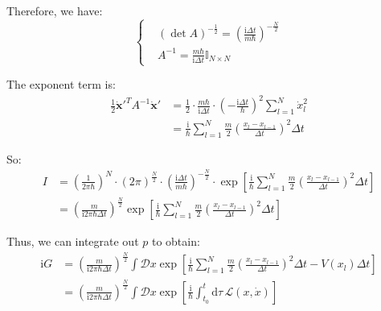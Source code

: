 Therefore, we have:
\begin{equation}
\left\{
\begin{aligned}
&(\det A)^{-\frac{1}{2}} = \left( \frac{\mathrm{i}\Delta t}{m\hbar} \right)^{-\frac{N}{2}}\\
&A^{-1} = \frac{m\hbar}{\mathrm{i}\Delta t} \mathbb{I}_{N \times N}
\end{aligned}
\right.
\end{equation}

The exponent term is:
\begin{equation}
\begin{aligned}
\frac{1}{2} \dot{\bm{x}}'^T A^{-1} \dot{\bm{x}}' 
&= \frac{1}{2} \cdot \frac{m\hbar}{\mathrm{i}\Delta t} \cdot \left( -\frac{\mathrm{i} \Delta t}{\hbar} \right)^2 \sum_{l=1}^N \dot{x}_l^2 \\
&= \frac{\mathrm{i}}{\hbar} \sum_{l=1}^N \frac{m}{2} (\frac{x_l - x_{l-1}}{\Delta t})^2 \Delta t
\end{aligned}
\end{equation}

So:
\begin{equation}
\begin{aligned}
I &= \left( \frac{1}{2\pi\hbar} \right)^N \cdot (2\pi)^{\frac{N}{2}} \cdot \left( \frac{\mathrm{i}\Delta t}{m\hbar} \right)^{-\frac{N}{2}} 
\cdot \exp \left[ \frac{\mathrm{i}}{\hbar} \sum_{l=1}^N  \frac{m}{2} (\frac{x_l-x_{l-1}}{\Delta t})^2 \Delta t \right] \\
&= \left( \frac{m}{\mathrm{i} 2\pi\hbar\Delta t} \right)^{\frac{N}{2}} 
\exp \left[ \frac{\mathrm{i}}{\hbar} \sum_{l=1}^N \frac{m}{2} (\frac{x_l-x_{l-1}}{\Delta t})^2 \Delta t \right]
\end{aligned}
\end{equation}

Thus, we can integrate out $p$ to obtain:
\begin{equation}
    \begin{aligned}
    \mathrm{i}G &= \left( \frac{m}{\mathrm{i} 2\pi\hbar\Delta t} \right)^{\frac{N}{2}} 
    \int \mathcal{D}x \exp \left[ \frac{\mathrm{i}}{\hbar} \sum_{l=1}^N  \frac{m}{2} (\frac{x_l-x_{l-1}}{\Delta t})^2 \Delta t - V(x_l) \Delta t \right] \\
    &= \left( \frac{m}{\mathrm{i} 2\pi\hbar\Delta t} \right)^{\frac{N}{2}} \int \mathcal{D}x 
    \exp \left[ \frac{\mathrm{i}}{\hbar} \int_{t_0}^{t} \mathrm{d} \tau \, \mathcal{L}(x, \dot{x}) \right]
    \end{aligned}
\end{equation}

